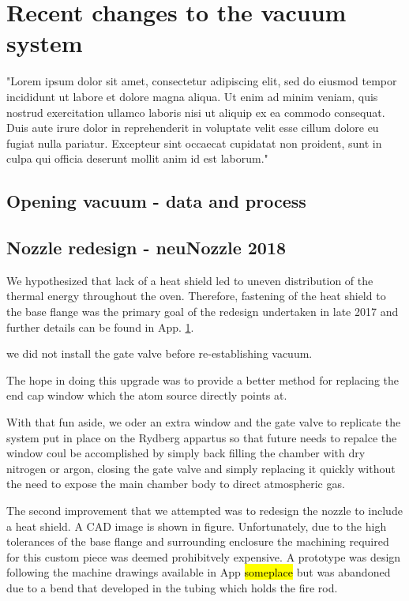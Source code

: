 \chapter{Recent changes to the vacuum system} \label{app:breakingVacuum}
"Lorem ipsum dolor sit amet, consectetur adipiscing elit, sed do eiusmod tempor incididunt ut labore et dolore magna aliqua. Ut enim ad minim veniam, quis nostrud exercitation ullamco laboris nisi ut aliquip ex ea commodo consequat. Duis aute irure dolor in reprehenderit in voluptate velit esse cillum dolore eu fugiat nulla pariatur. Excepteur sint occaecat cupidatat non proident, sunt in culpa qui officia deserunt mollit anim id est laborum."

\section{Opening vacuum - data and process}

\section{Nozzle redesign - neuNozzle 2018}


We hypothesized that lack of a heat shield led to uneven distribution of the thermal energy throughout the oven.
Therefore, fastening of the heat shield to the base flange was the primary goal of the redesign undertaken in late 2017 and further details can be found in App. \ref{app:breakingVacuum}. 

 we did not install the gate valve before re-establishing vacuum. 

The hope in doing this upgrade was to provide a better method for replacing the end cap window which the atom source directly points at. 

With that fun aside, we oder an extra window and the gate valve to replicate the system put in place on the Rydberg appartus so that future needs to repalce the window coul be accomplished by simply back filling the chamber with dry nitrogen or argon, closing the gate valve and simply replacing it quickly without the need to expose the main chamber body to direct atmospheric gas. 

The second improvement that we attempted was to redesign the nozzle to include a heat shield. A CAD image is shown in figure. Unfortunately, due to the high tolerances of the base flange and surrounding enclosure the machining required for this custom piece was deemed prohibitvely expensive. A prototype was design following the machine drawings available in App \hl{someplace} but was abandoned due to a bend that developed in the tubing which holds the fire rod. 

